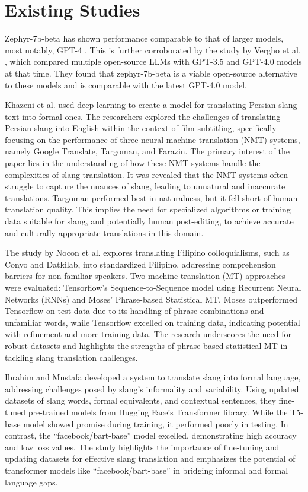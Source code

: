 \section{Existing Studies}
Zephyr-7b-beta has shown performance comparable to that of larger models, most notably, GPT-4 \cite{tunstall2023zephyr}. This is further corroborated by the study by Vergho et al. \cite{Vergho}, which compared multiple open-source LLMs with GPT-3.5 and GPT-4.0 models at that time. They found that zephyr-7b-beta is a viable open-source alternative to these models and is comparable with the latest GPT-4.0 model.

Khazeni et al. \cite{Khazeni} used deep learning to create a model for translating Persian slang text into formal ones. The researchers explored the challenges of translating Persian slang into English within the context of film subtitling, specifically focusing on the performance of three neural machine translation (NMT) systems, namely Google Translate, Targoman, and Farazin. The primary interest of the paper lies in the understanding of how these NMT systems handle the complexities of slang translation. It was revealed that the NMT systems often struggle to capture the nuances of slang, leading to unnatural and inaccurate translations. Targoman performed best in naturalness, but it fell short of human translation quality. This implies the need for specialized algorithms or training data suitable for slang, and potentially human post-editing, to achieve accurate and culturally appropriate translations in this domain.

The study by Nocon et al. \cite{Nocon_Kho_Arroyo_2018} explores translating Filipino colloquialisms, such as Conyo and Datkilab, into standardized Filipino, addressing comprehension barriers for non-familiar speakers. Two machine translation (MT) approaches were evaluated: Tensorflow's Sequence-to-Sequence model using Recurrent Neural Networks (RNNs) and Moses' Phrase-based Statistical MT. Moses outperformed Tensorflow on test data due to its handling of phrase combinations and unfamiliar words, while Tensorflow excelled on training data, indicating potential with refinement and more training data. The research underscores the need for robust datasets and highlights the strengths of phrase-based statistical MT in tackling slang translation challenges.

Ibrahim and Mustafa \cite{Ibrahim_Sharief} developed a system to translate slang into formal language, addressing challenges posed by slang's informality and variability. Using updated datasets of slang words, formal equivalents, and contextual sentences, they fine-tuned pre-trained models from Hugging Face's Transformer library. While the T5-base model showed promise during training, it performed poorly in testing. In contrast, the “facebook/bart-base” model excelled, demonstrating high accuracy and low loss values. The study highlights the importance of fine-tuning and updating datasets for effective slang translation and emphasizes the potential of transformer models like “facebook/bart-base” in bridging informal and formal language gaps. 

